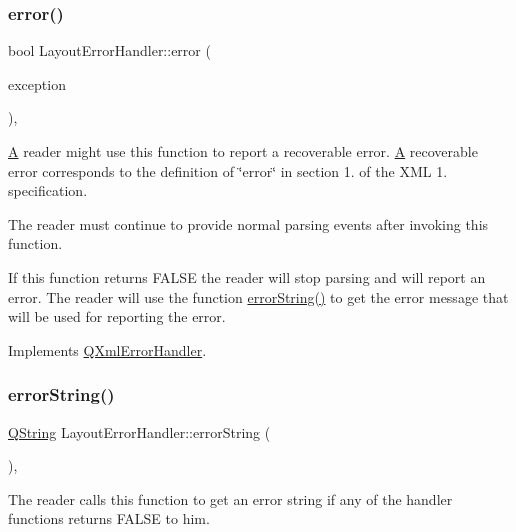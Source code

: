 \subsubsection{\texorpdfstring{error()}{error()}}
{\footnotesize\ttfamily bool Layout\+Error\+Handler\+::error (\begin{DoxyParamCaption}\item[{const \mbox{\hyperlink{class_q_xml_parse_exception}{Q\+Xml\+Parse\+Exception}} \&}]{exception }\end{DoxyParamCaption})\hspace{0.3cm}{\ttfamily [inline]}, {\ttfamily [virtual]}}

\mbox{\hyperlink{class_a}{A}} reader might use this function to report a recoverable error. \mbox{\hyperlink{class_a}{A}} recoverable error corresponds to the definition of \char`\"{}error\char`\"{} in section 1. of the X\+ML 1. specification.

The reader must continue to provide normal parsing events after invoking this function.

If this function returns F\+A\+L\+SE the reader will stop parsing and will report an error. The reader will use the function \mbox{\hyperlink{class_layout_error_handler_a042664a153147e99f4ee0cb3bdf76418}{error\+String()}} to get the error message that will be used for reporting the error. 

Implements \mbox{\hyperlink{class_q_xml_error_handler_aa7e25c4198fa16a0312fd48e5718217c}{Q\+Xml\+Error\+Handler}}.

\mbox{\label{class_layout_error_handler_a042664a153147e99f4ee0cb3bdf76418}} 
\subsubsection{\texorpdfstring{errorString()}{errorString()}}
{\footnotesize\ttfamily \mbox{\hyperlink{class_q_string}{Q\+String}} Layout\+Error\+Handler\+::error\+String (\begin{DoxyParamCaption}{ }\end{DoxyParamCaption})\hspace{0.3cm}{\ttfamily [inline]}, {\ttfamily [virtual]}}

The reader calls this function to get an error string if any of the handler functions returns F\+A\+L\+SE to him. 

